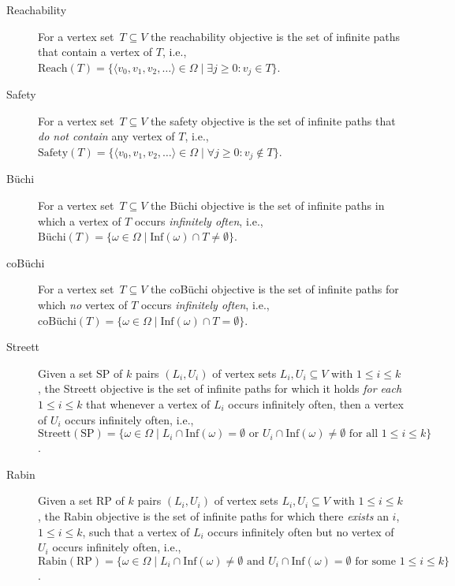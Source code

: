 \documentclass[11pt,letterpaper]{article}
\newcommand{\set}[1]{\{#1\}}
\newcommand{\Inf}{\mathrm{Inf}}
\newcommand{\reacht}[1]{\textrm{Reach}\left(#1\right)}
\newcommand{\streett}[1]{\textrm{Streett}\left(#1\right)}
\newcommand{\objsty}[2]{\textrm{#1}\left(#2\right)}
\newcommand{\SP}{\mathrm{SP}}
\renewcommand{\RP}{\mathrm{RP}}
\newcommand{\pat}{\omega\xspace}
\newcommand{\Path}{\Omega\xspace}
\newcommand{\sseq}{\langle v_0,v_1,v_2,\ldots\rangle}
\newcommand{\target}{T\xspace}
\begin{document}
\begin{description}
    \item[Reachability] For a vertex 
    set~$\target \subseteq V$ the reachability 
	objective is the set of infinite paths that contain a vertex of $\target$, i.e., 
	$\reacht{\target} = \set{\sseq \in \Path \mid \exists j \ge 0: v_j \in \target}$.
	
	\item[Safety] For a vertex set~$\target \subseteq V$ the safety 
	objective is the set of infinite paths that \emph{do not contain} any vertex 
	of $\target$, i.e., 
	$\objsty{Safety}{\target} = \set{\sseq \in \Path \mid \forall j \ge 0: v_j \notin \target}$.
	
    \item[B{\"u}chi] For a vertex set~$\target \subseteq V$ the B{\"u}chi 
	objective is the set of infinite paths in which a vertex of $\target$ occurs
	\emph{infinitely often}, i.e., 
	$\objsty{B{\"u}chi}{\target} = \set{\pat \in \Path \mid \Inf(\pat) \cap \target \ne \emptyset}$.
	
    \item[coB{\"u}chi] For a 
    vertex set~$\target \subseteq V$ the coB{\"u}chi 
	objective is the set of infinite paths for which \emph{no} vertex of $\target$ 
	occurs \emph{infinitely often}, i.e., 
	$\objsty{coB{\"u}chi}{\target} = \set{\pat \in \Path \mid \Inf(\pat) \cap \target = \emptyset}$.
	
    \item[Streett] Given a set $\SP$ of
	$k$ pairs $(L_i, U_i)$ of vertex sets $L_i, U_i
	\subseteq V$ with $1 \le i \le k$, the Streett objective is the set of infinite paths 
	for which it holds \emph{for each} $1 \le i \le k$ that whenever a vertex of $L_i$ 
	occurs infinitely often, then a vertex of $U_i$ occurs infinitely often, i.e., 
	$\streett{\SP} = \set{\pat \in \Path \mid
	L_i \cap \Inf(\pat) = \emptyset \text{ or } U_i \cap \Inf(\pat) \ne \emptyset 
	\text{ for all } 1 \le i \le k}$.
	
    \item[Rabin] Given a set $\RP$ of $k$ pairs $(L_i, U_i)$ of vertex sets $L_i, U_i 
	\subseteq V$ with $1 \le i \le k$, the Rabin objective is the set of infinite paths 
	for which there \emph{exists} an $i$, $1 \le i \le k$, such that a vertex of $L_i$ 
	occurs infinitely often but no vertex of $U_i$ occurs infinitely often, i.e., 
	$\objsty{Rabin}{\RP} = \set{\pat \in \Path \mid 
	L_i \cap \Inf(\pat) \ne \emptyset \text{ and } U_i \cap \Inf(\pat) = \emptyset 
	\text{ for some } 1 \le i \le k}$.
\end{description}
\end{document}
